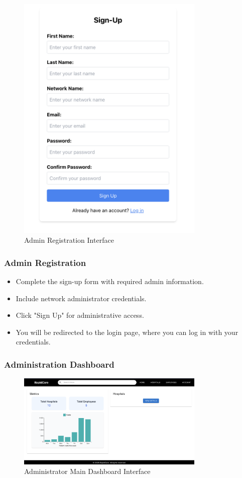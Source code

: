 \documentclass[12pt, titlepage]{article}
\begin{document}
\begin{figure}[H]
\centering
\includegraphics[width=0.8\textwidth]{signup.png}
\caption{Admin Registration Interface}
\label{fig:Registration}
\end{figure}

\subsubsection{Admin Registration}
\begin{itemize}
\item Complete the sign-up form with required admin information.
\item Include network administrator credentials.
\item Click "Sign Up" for administrative access.
\item You will be redirected to the login page, where you can log in with your credentials.
\end{itemize}

\subsubsection{Administration Dashboard}
\begin{figure}[H]
\centering
\includegraphics[width=0.8\textwidth]{admin.png}
\caption{Administrator Main Dashboard Interface}
\label{fig:admin_dashboard}
\end{figure}
\end{document}
